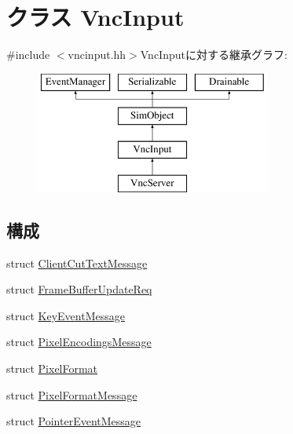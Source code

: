 \hypertarget{classVncInput}{
\section{クラス VncInput}
\label{classVncInput}
}


{\ttfamily \#include $<$vncinput.hh$>$}VncInputに対する継承グラフ:\begin{figure}[H]
\begin{center}
\leavevmode
\includegraphics[height=4cm]{classVncInput}
\end{center}
\end{figure}
\subsection*{構成}
\begin{DoxyCompactItemize}
\item 
struct \hyperlink{structVncInput_1_1ClientCutTextMessage}{ClientCutTextMessage}
\item 
struct \hyperlink{structVncInput_1_1FrameBufferUpdateReq}{FrameBufferUpdateReq}
\item 
struct \hyperlink{structVncInput_1_1KeyEventMessage}{KeyEventMessage}
\item 
struct \hyperlink{structVncInput_1_1PixelEncodingsMessage}{PixelEncodingsMessage}
\item 
struct \hyperlink{structVncInput_1_1PixelFormat}{PixelFormat}
\item 
struct \hyperlink{structVncInput_1_1PixelFormatMessage}{PixelFormatMessage}
\item 
struct \hyperlink{structVncInput_1_1PointerEventMessage}{PointerEventMessage}
\end{DoxyCompactItemize}
